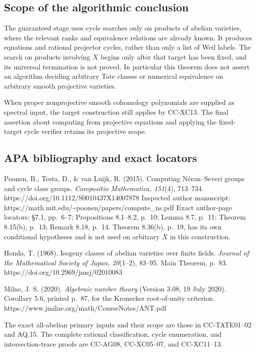 \subsection{Scope of the algorithmic
conclusion}\label{scope-of-the-algorithmic-conclusion}

The guaranteed stage uses cycle searches only on products of abelian
varieties, where the relevant ranks and equivalence relations are
already known. It produces equations and rational projector cycles,
rather than only a list of Weil labels. The search on products involving
\(X\) begins only after that target has been fixed, and its universal
termination is not proved. In particular this theorem does not assert an
algorithm deciding arbitrary Tate classes or numerical equivalence on
arbitrary smooth projective varieties.

When proper nonprojective smooth cohomology polynomials are supplied as
spectral input, the target construction still applies by CC-XC13. The
final assertion about computing from projective equations and applying
the fixed-target cycle verifier retains its projective scope.

\subsection{APA bibliography and exact
locators}\label{apa-bibliography-and-exact-locators}

Poonen, B., Testa, D., \& van Luijk, R. (2015). Computing Néron--Severi
groups and cycle class groups. \emph{Compositio Mathematica, 151}(4),
713--734. https://doi.org/10.1112/S0010437X14007878 Inspected author
manuscript:
https://math.mit.edu/\textasciitilde poonen/papers/compute\_ns.pdf Exact
author-page locators: §7.1, pp.~6--7; Propositions 8.1--8.2, p.~10;
Lemma 8.7, p.~11; Theorem 8.15(b), p.~13; Remark 8.18, p.~14. Theorem
8.36(b), p.~19, has its own conditional hypotheses and is not used on
arbitrary \(X\) in this construction.

Honda, T. (1968). Isogeny classes of abelian varieties over finite
fields. \emph{Journal of the Mathematical Society of Japan, 20}(1--2),
83--95. Main Theorem, p.~83. https://doi.org/10.2969/jmsj/02010083

Milne, J. S. (2020). \emph{Algebraic number theory} (Version 3.08, 19
July 2020). Corollary 5.6, printed p.~87, for the Kronecker
root-of-unity criterion. https://www.jmilne.org/math/CourseNotes/ANT.pdf

The exact all-abelian primary inputs and their scope are those in
CC-TATE01--02 and AQ.15. The complete rational classification, cycle
enumeration, and intersection-trace proofs are CC-AG08, CC-XC05--07, and
CC-XC11--13.
